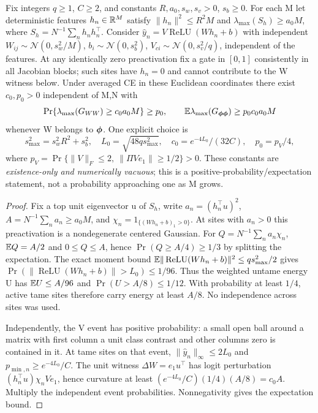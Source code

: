 \begin{theorem}
\label{thm:astra_interior_relu}
Fix integers $q\ge1$, $C\ge2$, and constants $R,a_0,s_w,s_v>0$,
$s_b\ge0$. For each M let deterministic features $h_n\in\mathbb{R}^M$ satisfy
$\|h_n\|^2\le R^2M$ and
$\lambda_{\max}(S_h)\ge a_0M$, where
$S_h=N^{-1}\sum_nh_nh_n^\top$.
Consider $\hat y_n=V\operatorname{ReLU}(Wh_n+b)$ with independent
$W_{ij}\sim\mathcal N(0,s_w^2/M)$, $b_i\sim\mathcal N(0,s_b^2)$,
$V_{ci}\sim\mathcal N(0,s_v^2/q)$, independent of the features.
At any identically zero preactivation fix a gate in $[0,1]$ consistently
in all Jacobian blocks; such sites have $h_n=0$ and cannot contribute
to the W witness below. Under averaged CE in these Euclidean
coordinates there exist $c_0,p_0>0$
independent of M,N with
\[
 \Pr\{\lambda_{\max}(G_{WW})\ge c_0a_0M\}\ge p_0,
 \qquad \mathbb{E}\lambda_{\max}(G_{{\boldsymbol{\phi}}{\boldsymbol{\phi}}})\ge p_0c_0a_0M
\]
whenever W belongs to ${\boldsymbol{\phi}}$.
One explicit choice is
\[
 s_{\max}^2=s_w^2R^2+s_b^2,\quad L_0=\sqrt{48q s_{\max}^2},
 \quad c_0=e^{-4L_0}/(32C),\quad p_0=p_V/4,
\]
where $p_V=\Pr\{\|V\|_F\le2,\ \|\Pi Ve_1\|\ge1/2\}>0$.
These constants are \emph{existence-only and numerically vacuous}; this
is a positive-probability/expectation statement, not a probability
approaching one as M grows.
\end{theorem}
\begin{proof}
Fix a top unit eigenvector u of $S_h$, write
$a_n=(h_n^\top u)^2$, $A=N^{-1}\sum_na_n\ge a_0M$, and
$\chi_n=1_{\{(Wh_n+b)_1>0\}}$.
At sites with $a_n>0$ this preactivation is a nondegenerate centered
Gaussian. For $Q=N^{-1}\sum_na_n\chi_n$, $\mathbb{E} Q=A/2$ and $0\le Q\le A$,
hence $\Pr(Q\ge A/4)\ge1/3$ by splitting the expectation.
The exact moment bound
$\mathbb{E}\|\operatorname{ReLU}(Wh_n+b)\|^2\le qs_{\max}^2/2$
gives $\Pr(\|\operatorname{ReLU}(Wh_n+b)\|>L_0)\le1/96$.
Thus the weighted untame energy U has $\mathbb{E} U\le A/96$ and
$\Pr(U>A/8)\le1/12$. With probability at least $1/4$, active tame
sites therefore carry energy at least $A/8$. No independence across
sites was used.

Independently, the V event has positive probability: a small open ball
around a matrix with first column a unit class contrast and other
columns zero is contained in it. At tame sites on that event,
$\|\hat y_n\|_\infty\le2L_0$ and $p_{\min,n}\ge e^{-4L_0}/C$.
The unit witness $\Delta W=e_1u^\top$ has logit perturbation
$(h_n^\top u)\chi_nVe_1$, hence curvature at least
$(e^{-4L_0}/C)(1/4)(A/8)=c_0A$. Multiply the independent event
probabilities. Nonnegativity gives the expectation bound.
\end{proof}
